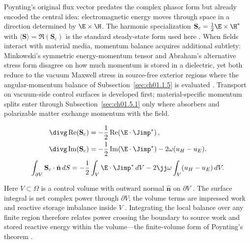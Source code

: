 Poynting's original flux vector \cite{poynting1884} predates the complex phasor form but already encoded the central idea: electromagnetic energy moves through space in a direction determined by $\E\times\H$. The harmonic specialization $\mathbf{S}_\mathrm{c}=\tfrac12\E\times\H^*$ with $\langle\mathbf{S}\rangle=\Re(\mathbf{S}_\mathrm{c})$ is the standard steady-state form used here \cite{stratton1941}. When fields interact with material media, momentum balance acquires additional subtlety: Minkowski's symmetric energy-momentum tensor \cite{minkowski1908} and Abraham's alternative stress form disagree on how much momentum is stored in a dielectric, yet both reduce to the vacuum Maxwell stress in source-free exterior regions where the angular-momentum balance of Subsection~\ref{sec:ch01.1.5} is evaluated \cite{stratton1941}. Transport on vacuum-side control surfaces is developed first; material-specific momentum splits enter through Subsection~\ref{sec:ch01.5.1} only where absorbers and polarizable matter exchange momentum with the field.

\begin{equation}
\label{eq:ch1.poynting-real-imag-split}
\begin{aligned}
\divg\Re(\mathbf{S}_\mathrm{c})&=-\frac12\Re\!\left(\E\cdot\Jimp^*\right),\\
\divg\Im(\mathbf{S}_\mathrm{c})&=-\frac12\Im\!\left(\E\cdot\Jimp^*\right)-2\omega(u_H-u_E).
\end{aligned}
\end{equation}
\begin{equation}
\label{eq:ch1.dual-invariant-energy}\int_{\partial V}\mathbf{S}_\mathrm{c}\cdot\hat{\mathbf{n}}\,dS
=-\frac12\int_V\E\cdot\Jimp^*\,dV
-2\jj\omega\int_V(u_H-u_E)\,dV.
\end{equation}
\addtocounter{equation}{-1}\label{eq:ch1.power-balance-integral}%
Here $V\subset\Omega$ is a control volume with outward normal $\hat{\mathbf{n}}$ on $\partial V$ \cite{stratton1941}. The surface integral is net complex power through $\partial V$; the volume terms are impressed work and reactive storage imbalance inside $V$ \cite{poynting1884}. Integrating the local balance over any finite region therefore relates power crossing the boundary to source work and stored reactive energy within the volume---the finite-volume form of Poynting's theorem \cite{stratton1941}.

